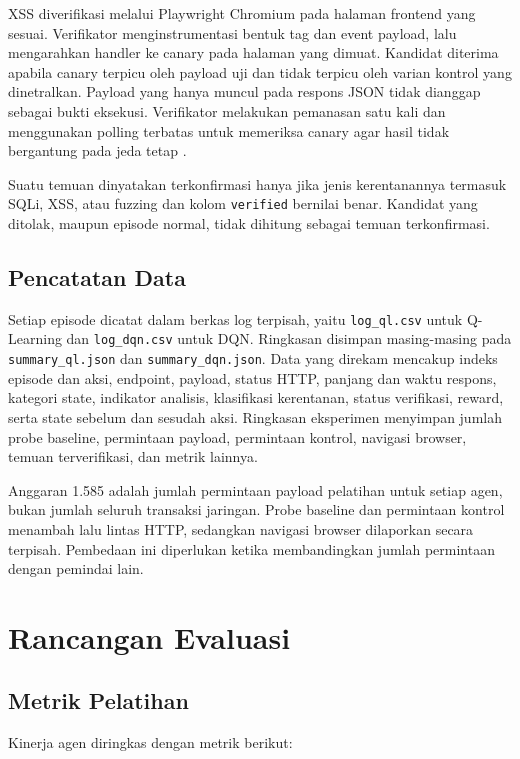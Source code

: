 XSS diverifikasi melalui Playwright Chromium pada halaman frontend yang sesuai. Verifikator menginstrumentasi bentuk tag dan event payload, lalu mengarahkan handler ke canary pada halaman yang dimuat. Kandidat diterima apabila canary terpicu oleh payload uji dan tidak terpicu oleh varian kontrol yang dinetralkan. Payload yang hanya muncul pada respons JSON tidak dianggap sebagai bukti eksekusi. Verifikator melakukan pemanasan satu kali dan menggunakan polling terbatas untuk memeriksa canary agar hasil tidak bergantung pada jeda tetap \cite{playwrightPageApi}.

Suatu temuan dinyatakan terkonfirmasi hanya jika jenis kerentanannya termasuk SQLi, XSS, atau fuzzing dan kolom \texttt{verified} bernilai benar. Kandidat yang ditolak, maupun episode normal, tidak dihitung sebagai temuan terkonfirmasi.

\subsection{Pencatatan Data}

Setiap episode dicatat dalam berkas log terpisah, yaitu \texttt{log\_ql.csv} untuk Q-Learning dan \texttt{log\_dqn.csv} untuk DQN. Ringkasan disimpan masing-masing pada \texttt{summary\_ql.json} dan \texttt{summary\_dqn.json}. Data yang direkam mencakup indeks episode dan aksi, endpoint, payload, status HTTP, panjang dan waktu respons, kategori state, indikator analisis, klasifikasi kerentanan, status verifikasi, reward, serta state sebelum dan sesudah aksi. Ringkasan eksperimen menyimpan jumlah probe baseline, permintaan payload, permintaan kontrol, navigasi browser, temuan terverifikasi, dan metrik lainnya.

Anggaran 1.585 adalah jumlah permintaan payload pelatihan untuk setiap agen, bukan jumlah seluruh transaksi jaringan. Probe baseline dan permintaan kontrol menambah lalu lintas HTTP, sedangkan navigasi browser dilaporkan secara terpisah. Pembedaan ini diperlukan ketika membandingkan jumlah permintaan dengan pemindai lain.

\section{Rancangan Evaluasi}

\subsection{Metrik Pelatihan}

Kinerja agen diringkas dengan metrik berikut:

